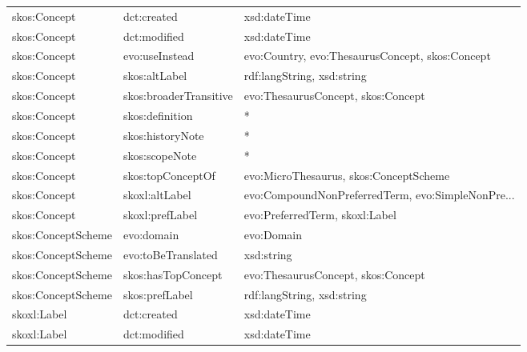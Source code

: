 \documentclass[10pt,a4paper,titlepage,final]{article}
\begin{document}
\begin{tabularx}{\textwidth}{llX}
                 skos:Concept &                   dct:created &                                       xsd:dateTime \\
                 skos:Concept &                  dct:modified &                                       xsd:dateTime \\
                 skos:Concept &                evo:useInstead &    evo:Country, evo:ThesaurusConcept, skos:Concept \\
                 skos:Concept &                 skos:altLabel &                         rdf:langString, xsd:string \\
                 skos:Concept &        skos:broaderTransitive &                 evo:ThesaurusConcept, skos:Concept \\
                 skos:Concept &               skos:definition &                                                  * \\
                 skos:Concept &              skos:historyNote &                                                  * \\
                 skos:Concept &                skos:scopeNote &                                                  * \\
                 skos:Concept &             skos:topConceptOf &             evo:MicroThesaurus, skos:ConceptScheme \\
                 skos:Concept &                skoxl:altLabel &  evo:CompoundNonPreferredTerm, evo:SimpleNonPre... \\
                 skos:Concept &               skoxl:prefLabel &                     evo:PreferredTerm, skoxl:Label \\
           skos:ConceptScheme &                    evo:domain &                                         evo:Domain \\
           skos:ConceptScheme &            evo:toBeTranslated &                                         xsd:string \\
           skos:ConceptScheme &            skos:hasTopConcept &                 evo:ThesaurusConcept, skos:Concept \\
           skos:ConceptScheme &                skos:prefLabel &                         rdf:langString, xsd:string \\
                  skoxl:Label &                   dct:created &                                       xsd:dateTime \\
                  skoxl:Label &                  dct:modified &                                       xsd:dateTime \\

\end{tabularx}
\end{document}

